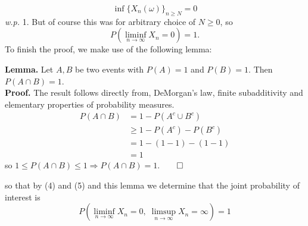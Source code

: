 \documentclass[11pt, letterpaper]{article}
\begin{document}
    \[\inf\{X_n(\omega)\}_{n\geq N}=0\]
    {\it w.p.} 1. But of course this was for arbitrary choice of $N\geq 0$, so
    \[P(\liminf_{n\rightarrow\infty}X_n=0)=1.\tag{5}\]
    To finish the proof, we make use of the following lemma:
    \begin{center}
        \begin{minipage}[c]{0.85\linewidth}
            {\bf Lemma.} Let $A,B$ be two events with $P(A)=1$ and $P(B)=1$. Then $P(A\cap B)=1$.\\[10pt]
            {\bf Proof.} The result follows directly from, DeMorgan's law, finite subadditivity and elementary properties of probability measures.
            \begin{align*}
                P(A\cap B)&=1-P(A^c\cup B^c)\tag{DeMorgan's law}\\
                &\geq1-P(A^c)-P(B^c)\tag{finite subadditivity}\\
                &=1-(1-1)-(1-1)\\
                &=1
            \end{align*}
            so $1\leq P(A\cap B)\leq 1\Rightarrow P(A\cap B)=1$.\hfill{$\qed$}
        \end{minipage}\vspace{10pt}
    \end{center}
    so that by (4) and (5) and this lemma we determine that the joint probability of interest is
    \[P(\liminf_{n\rightarrow\infty}X_n=0,\;\limsup_{n\rightarrow\infty}X_n=\infty)=1\tag*{$\qed$}\]
\end{document}
